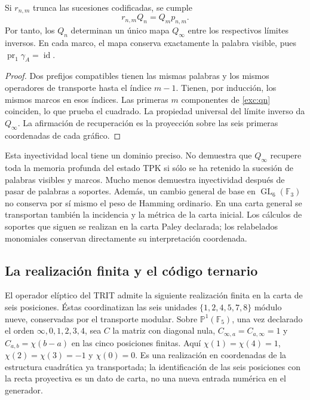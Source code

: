 \begin{proposition}
\label{exc:limite-inverso}
Si $r_{n,m}$ trunca las sucesiones codificadas, se cumple
\[
 r_{n,m}Q_n=Q_m p_{n,m}.
\]
Por tanto, los $Q_n$ determinan un único mapa $Q_\infty$ entre los
respectivos límites inversos. En cada marco, el mapa conserva exactamente
la palabra visible, pues $\operatorname{pr}_1\gamma_A=\operatorname{id}$.
\end{proposition}

\begin{proof}
Dos prefijos compatibles tienen las mismas palabras y los mismos
operadores de transporte hasta el índice $m-1$. Tienen, por inducción,
los mismos marcos en esos índices. Las primeras $m$ componentes de
\eqref{exc:qn} coinciden, lo que prueba el cuadrado. La propiedad
universal del límite inverso da $Q_\infty$. La afirmación de recuperación
es la proyección sobre las seis primeras coordenadas de cada gráfico.
\end{proof}

Esta inyectividad local tiene un dominio preciso. No demuestra que
$Q_\infty$ recupere toda la memoria profunda del estado TPK si sólo se
ha retenido la sucesión de palabras visibles y marcos. Mucho menos
demuestra inyectividad después de pasar de palabras a soportes.
Además, un cambio general de base en $\operatorname{GL}_6(\mathbb F_3)$
no conserva por sí mismo el peso de Hamming ordinario. En una carta
general se transportan también la incidencia y la métrica de la carta
inicial. Los cálculos de soportes que siguen se realizan en la carta
Paley declarada; los relabelados monomiales conservan directamente su
interpretación coordenada.

\subsection{La realización finita y el código ternario}
\label{exc:paley-codigo}

El operador elíptico del TRIT admite la siguiente realización finita en
la carta de seis posiciones. Éstas coordinatizan las seis unidades
$\{1,2,4,5,7,8\}$ módulo nueve, conservadas por el transporte modular.
Sobre $\mathbb P^1(\mathbb F_5)$, una vez
declarado el orden $\infty,0,1,2,3,4$, sea $C$ la matriz con diagonal
nula, $C_{\infty,a}=C_{a,\infty}=1$ y
$C_{a,b}=\chi(b-a)$ en las cinco posiciones finitas. Aquí
$\chi(1)=\chi(4)=1$, $\chi(2)=\chi(3)=-1$ y $\chi(0)=0$.
Es una realización en coordenadas de la estructura cuadrática ya
transportada; la identificación de las seis posiciones con la recta
proyectiva es un dato de carta, no una nueva entrada numérica en el
generador.

